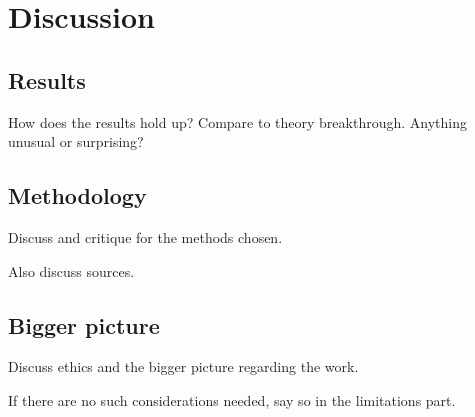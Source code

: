 \chapter{Discussion}\label{cha:discussion}


\section{Results}\label{sec:disc:results}

How does the results hold up? Compare to theory breakthrough. Anything unusual or surprising?


\section{Methodology}\label{sec:disc:method}

Discuss and critique for the methods chosen.

Also discuss sources.


\section{Bigger picture}\label{sec:disc:big}

Discuss ethics and the bigger picture regarding the work.

If there are no such considerations needed, say so in the limitations part.
